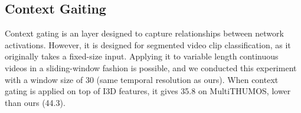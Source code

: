 \documentclass{article}
\begin{document}
\subsection{Context Gaiting}

Context gating \cite{miech2017learnable} is an layer designed to capture relationships between network activations. However, it is designed for segmented video clip classification, as it originally takes a fixed-size input. Applying it to variable length continuous videos in a sliding-window fashion is possible, and we conducted this experiment with a window size of 30 (same temporal resolution as ours). When context gating is applied on top of I3D features, it gives 35.8 on MultiTHUMOS, lower than ours (44.3).
\end{document}
